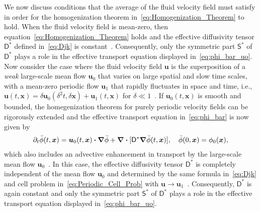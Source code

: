 \documentclass[leqno,onefignum,onetabnum]{siamltex1213}
\newcommand{\Dm}{\mathsf{D}}
\newcommand{\Sm}{\mathsf{S}}
\newcommand\bnabla{\mbox{\boldmath${\nabla}$}}
\providecommand\bcdot{\boldsymbol{\cdot}}
\newcommand{\vecx}{\boldsymbol{x}}
\newcommand{\vecu}{\boldsymbol{u}}
\begin{document}
We now discuss conditions that the average of the fluid velocity field
must satisfy in order for the homogenization theorem
in~\eqref{eq:Homogenization_Theorem} to hold. When the fluid velocity
field is mean-zero, then equation~\eqref{eq:Homogenization_Theorem}
holds and the effective diffusivity tensor $\Dm^*$ defined
in~\eqref{eq:Djk} is
constant~\cite{Majda:Kramer:1999:book}. Consequently, only the
symmetric part $\Sm^*$ of $\Dm^*$ plays a role in the effective
transport equation displayed in~\eqref{eq:phi_bar_uo}. Now consider
the case where the fluid velocity field $\vecu$ is the superposition
of a \emph{weak} large-scale mean flow $\vecu_0$ that varies on large
spatial and slow time scales, with a mean-zero periodic flow $\vecu_1$
that rapidly fluctuates in space and time, i.e.,
$\vecu(t,\vecx)=\delta\vecu_0(\delta^2t,\delta\vecx)+\vecu_1(t,\vecx)$ for
$\delta\ll1$~\cite{Majda:Kramer:1999:book}. If 
$\vecu_0(t,\vecx)$ is smooth and bounded, the homegenization theorem
for purely periodic velocity fields can be rigorously extended and the
effective transport equation in~\eqref{eq:phi_bar} is now given
by~\cite{Majda:Kramer:1999:book}  
%
\begin{align}\label{eq:phi_bar_uo}
  \partial_t\bar{\phi}(t,\vecx)=\vecu_0(t,\vecx)\bcdot\bnabla\bar{\phi}
                   +\bnabla\bcdot[\Dm^*\bnabla\bar{\phi}(t,\vecx)],
  \quad 
  \bar{\phi}(0,\vecx)=\phi_0(\vecx),
\end{align}
%
which also includes an advective enhancement in transport by the
large-scale mean flow $\vecu_0$~\cite{Majda:Kramer:1999:book}. In this
case, the effective diffusivity tensor $\Dm^*$ is completely
independent of the mean flow $\vecu_0$ and determined by the same
formula in~\eqref{eq:Djk} and cell problem
in~\eqref{eq:Periodic_Cell_Prob} with
$\vecu\to\vecu_1$~\cite{Majda:Kramer:1999:book}. Consequently, $\Dm^*$
is again constant and only the symmetric part $\Sm^*$ of $\Dm^*$ plays
a role in the effective transport equation displayed
in~\eqref{eq:phi_bar_uo}. 
\end{document}
